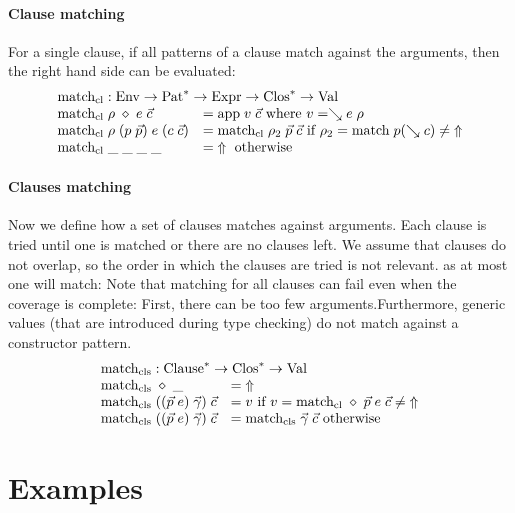 \paragraph*{Clause matching}
For a single clause, if all patterns of a clause match against the arguments, then the right hand side can be evaluated: 
\[
\begin{array}{ll}
\multicolumn{2}{l}{\matchcl : \Env \ra \ves{\Pat} \ra \Expr \ra \ves{\Clos} \ra \Val}\\
\matchcl \; \rho \; \diamond \; e \; \vec{c} & = \ap \; v \; \vec{c} \mbox{ where } v = \wh e \; \rho \\

\matchcl \; \rho \; (p \; \vec{p}) \; e \; (c \; \vec{c}) & = \matchcl \; \rho_2 \; \vec{p} \; \vec{c} \mbox{ if } \rho_2 = \match \; p (\wh c) \neq \stuck \\  
\matchcl \; \_ \; \_\; \_ \; \_ & = \stuck \mbox{ otherwise}\\  
\end{array}
\]

\paragraph*{Clauses matching} 
Now we define how a set of clauses matches against arguments. 
Each clause is tried until one is matched or there are no clauses left. We assume that clauses do not overlap, so the order in which the clauses are tried is not relevant. as at most one will match:
Note that matching for all clauses can fail even when the coverage is complete: First, there can be too few arguments.Furthermore, generic values (that are introduced during type checking) do not match against a constructor pattern. 
\[
\begin{array}{ll}
\multicolumn{2}{l}{\matchcls : \ves{\Clause} \ra \ves{\Clos} \ra \Val}\\
\matchcls \; \diamond \; \_ & = \stuck \\
\matchcls \;  ((\vec{p} \; e)\;\vec{\gamma}) \; \vec{c} & = v \mbox{ if } v = \matchcl \; \diamond \; \vec{p} \; e \;  \vec{c} \neq \stuck \\
\matchcls \; ((\vec{p} \; e)\;\vec{\gamma}) \; \vec{c} & = \matchcls \; \vec{\gamma} \; \vec{c} \mbox{ otherwise}  
\end{array}
\]


\section{Examples}
